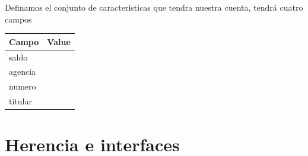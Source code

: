 Definamos el conjunto de caracteristicas que tendra nuestra cuenta, tendr\'a cuatro campos 

\begin{center}
  \begin{tabular}[t]{l l}
    Campo       &     Value\\ \hline
    saldo 	    &   	     \\  
    agencia 	  &   	     \\  
    numero 	    &  	       \\   
    titular 	  &  	       \\ \hline
  \end{tabular}
\end{center}

\section{Herencia e interfaces}
